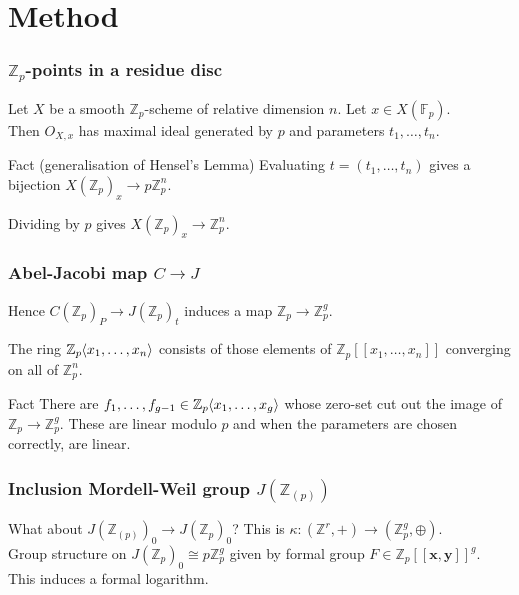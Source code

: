 \documentclass[15pt]{beamer}
\newcommand{\Z}{\mathbb{Z}}
\newcommand{\vx}{\mathbf{x}}
\newcommand{\vy}{\mathbf{y}}
\newcommand{\F}{\mathbb{F}}
\renewcommand{\angle}[1]{\hspace{-2pt}\left\langle #1 \right\rangle}
\begin{document}
\section{Method}
\begin{frame}
    \frametitle{$\Z_p$-points in a residue disc}
    Let $X$ be a smooth $\Z_p$-scheme of relative dimension $n$. Let $x \in X(\F_p)$.\\\pause
    Then $O_{X,x}$ has maximal ideal generated by $p$ and parameters $t_1,\dots,t_n$.
    \begin{block}{Fact (generalisation of Hensel's Lemma)}
    Evaluating $t = (t_1,\dots,t_n)$  gives a bijection $X(\Z_p)_x \to p\Z_p^n$.
    \end{block}\pause
    Dividing by $p$ gives $X(\Z_p)_x \xrightarrow{~} \Z_p^n$.
\end{frame}

\begin{frame}
    \frametitle{Abel-Jacobi map $C \to J$}
    Hence $C(\Z_p)_P \to J(\Z_p)_t$ induces a map $\Z_p \to \Z_p^g$.
    \begin{definition}
    The ring $\Z_p\angle{x_1,\dots,x_n}$ consists of those elements of $\Z_p[[x_1,\dots,x_n]]$ converging on all of $\Z_p^n$.
    \end{definition}
    \begin{block}{Fact}
    There are $f_1,\dots,f_{g-1} \in \Z_p\angle{x_1,\dots,x_{g}}$ whose zero-set cut out the image of $\Z_p \to \Z_p^g$. These are linear modulo $p$ and when the parameters are chosen correctly, are linear.
    \end{block}\pause
\end{frame}

\begin{frame}
    \frametitle{Inclusion Mordell-Weil group $J(\Z_{(p)})$}
    What about $J(\Z_{(p)})_0 \to J(\Z_p)_0$? This is $\kappa: (\Z^r,+) \to (\Z_p^g,\oplus)$.\\\pause
    Group structure on $J(\Z_p)_0 \cong p\Z_p^g$ given by formal group $F \in \Z_p[[\vx,\vy]]^g$.\pause
    This induces a formal logarithm.
\end{frame}
\end{document}

